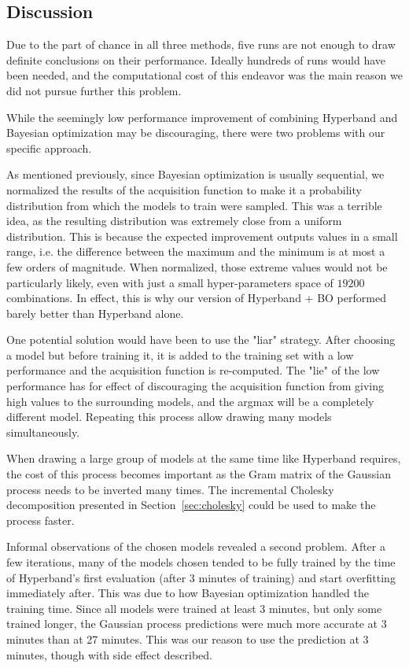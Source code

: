 \subsection{Discussion}

Due to the part of chance in all three methods, five runs are not enough to draw definite conclusions on their performance. Ideally hundreds of runs would have been needed, and the computational cost of this endeavor was the main reason we did not pursue further this problem.

While the seemingly low performance improvement of combining Hyperband and Bayesian optimization may be discouraging, there were two problems with our specific approach. 

As mentioned previously, since Bayesian optimization is usually sequential, we normalized the results of the acquisition function to make it a probability distribution from which the models to train were sampled. This was a terrible idea, as the resulting distribution was extremely close from a uniform distribution. This is because the expected improvement outputs values in a small range, i.e. the difference between the maximum and the minimum is at most a few orders of magnitude. When normalized, those extreme values would not be particularly likely, even with just a small hyper-parameters space of $19 200$ combinations. In effect, this is why our version of Hyperband + BO performed barely better than Hyperband alone. 

One potential solution would have been to use the "liar" strategy. After choosing a model but before training it, it is added to the training set with a low performance and the acquisition function is re-computed. The "lie" of the low performance has for effect of discouraging the acquisition function from giving high values to the surrounding models, and the argmax will be a completely different model. Repeating this process allow drawing many models simultaneously. 

When drawing a large group of models at the same time like Hyperband requires, the cost of this process becomes important as the Gram matrix of the Gaussian process needs to be inverted many times. The incremental Cholesky decomposition presented in Section~\ref{sec:cholesky} could be used to make the process faster.

Informal observations of the chosen models revealed a second problem. After a few iterations, many of the models chosen tended to be fully trained by the time of Hyperband's first evaluation (after 3 minutes of training) and start overfitting immediately after. This was due to how Bayesian optimization handled the training time. Since all models were trained at least 3 minutes, but only some trained longer, the Gaussian process predictions were much more accurate at 3 minutes than at 27 minutes. This was our reason to use the prediction at 3 minutes, though with side effect described.


